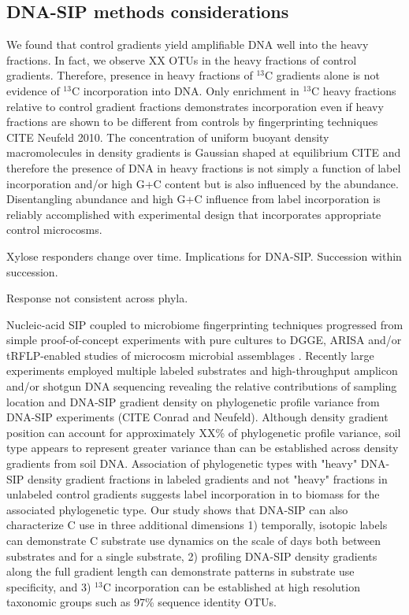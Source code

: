 \subsection{DNA-SIP methods considerations}
We found that control gradients yield amplifiable DNA well into the heavy
fractions. In fact, we observe XX OTUs in the heavy fractions of control
gradients. Therefore, presence in heavy fractions of $^{13}$C gradients alone
is not evidence of $^{13}$C incorporation into DNA. Only enrichment in
$^{13}$C heavy fractions relative to control gradient fractions demonstrates
incorporation even if heavy fractions are shown to be different from controls
by fingerprinting techniques CITE Neufeld 2010. The concentration of uniform
buoyant density macromolecules in density gradients is Gaussian shaped at
equilibrium CITE and therefore the presence of DNA in heavy fractions is not
simply a function of label incorporation and/or high G+C content but is also
influenced by the abundance. Disentangling abundance and high G+C influence
from label incorporation is reliably accomplished with experimental design that
incorporates appropriate control microcosms.

Xylose responders change over time. Implications for DNA-SIP. Succession within
succession.

Response not consistent across phyla.

Nucleic-acid SIP coupled to microbiome fingerprinting techniques progressed
from simple proof-of-concept experiments with pure cultures
\citep{radajewski2000stable} to DGGE, ARISA and/or tRFLP-enabled studies of
microcosm microbial assemblages \citep{Haichar_2007}. Recently large
experiments employed multiple labeled substrates and high-throughput amplicon
and/or shotgun DNA sequencing \citep{Verastegui_2014} revealing the relative
contributions of sampling location and DNA-SIP gradient density on phylogenetic
profile variance from DNA-SIP experiments (CITE Conrad and Neufeld). Although
density gradient position can account for approximately XX\% of phylogenetic
profile variance, soil type appears to represent greater variance than can be
established across density gradients from soil DNA. Association of phylogenetic
types with "heavy" DNA-SIP density gradient fractions in labeled gradients and
not "heavy" fractions in unlabeled control gradients suggests label
incorporation in to biomass for the associated phylogenetic type. Our study
shows that DNA-SIP can also characterize C use in three additional 
dimensions 1) temporally, isotopic labels can demonstrate C substrate use
dynamics on the scale of days both between substrates and for a single
substrate, 2) profiling DNA-SIP density gradients along the full gradient
length can demonstrate patterns in substrate use specificity, and 3) $^{13}$C
incorporation can be established at high resolution taxonomic groups such
as 97\% sequence identity OTUs.


